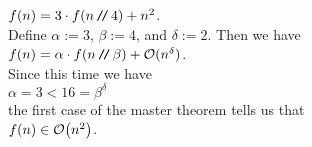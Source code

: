 \begin{enumerate}
      \hspace*{1.3cm}
      $f(n) = 3 \cdot f(n \mbox{\,\texttt{/}$\!$\texttt{/}\,} 4) + n^2$.
      \\[0.2cm]
      Define $\alpha := 3$, $\beta := 4$, and $\delta := 2$.  Then we have
      \\[0.2cm]
      \hspace*{1.3cm}
      $f(n) = \alpha \cdot f(n \mbox{\,\texttt{/}$\!$\texttt{/}\,} \beta) + \mathcal{O}(n^\delta)$.
      \\[0.2cm]
      Since this time we have
      \\[0.2cm]
      \hspace*{1.3cm}
      $\alpha = 3 < 16 = \beta^\delta$
      \\[0.2cm]
      the first case of the master theorem tells us that
      \\[0.2cm]
      \hspace*{1.3cm}
      $f(n) \in \mathcal{O}\bigl(n^2\bigr)$.
\end{enumerate}

